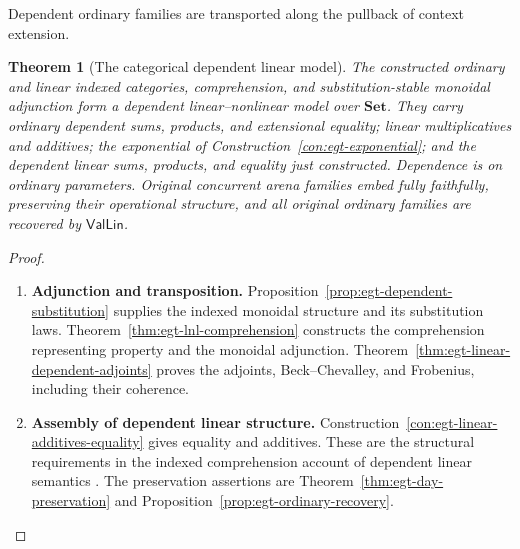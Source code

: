 \documentclass[11pt,a4paper]{article}
\numberwithin{equation}{section}
\newtheorem{theorem}{Theorem}[section]
\theoremstyle{definition}
\theoremstyle{remark}
\theoremstyle{plain}
\begin{document}
\noindent Dependent ordinary families are transported along the pullback of context extension.
\begin{center}
\end{center}

\begin{theorem}[The categorical dependent linear model]
\label{thm:egt-dependent-model}
The constructed ordinary and linear indexed categories, comprehension,
and substitution-stable monoidal adjunction form a dependent
linear--nonlinear model over $\mathbf{Set}$. They carry ordinary
dependent sums, products, and extensional equality; linear
multiplicatives and additives; the exponential of
Construction~\ref{con:egt-exponential}; and the dependent linear sums,
products, and equality just constructed. Dependence is on ordinary
parameters. Original concurrent arena families embed fully faithfully,
preserving their operational structure, and all original ordinary
families are recovered by $\mathsf{Val}\mathsf{Lin}$.
\end{theorem}
\begin{proof}
\leavevmode
\begin{enumerate}[label=\textup{(\arabic*)},leftmargin=*,itemsep=4pt,topsep=3pt]
  \item \textbf{Adjunction and transposition.} Proposition~\ref{prop:egt-dependent-substitution} supplies the indexed
monoidal structure and its substitution laws. Theorem~\ref{thm:egt-lnl-comprehension} constructs the comprehension
representing property and the monoidal adjunction. Theorem~\ref{thm:egt-linear-dependent-adjoints} proves the adjoints,
Beck--Chevalley, and Frobenius, including their coherence.
  \item \textbf{Assembly of dependent linear structure.} Construction~\ref{con:egt-linear-additives-equality} gives equality and
additives. These are the structural requirements in the indexed
comprehension account of dependent linear semantics
\citep[Sections~3--4]{Vakar2015LinearFrameworks}. The preservation assertions are
Theorem~\ref{thm:egt-day-preservation} and
Proposition~\ref{prop:egt-ordinary-recovery}.
\end{enumerate}
\end{proof}
\end{document}
